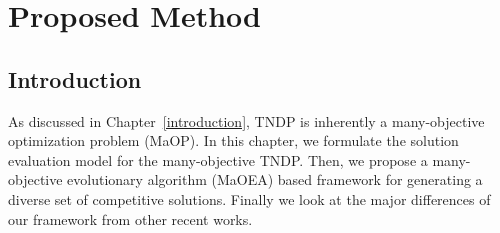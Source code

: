 \chapter{Proposed Method}
\label{proposedmethod}

\section{Introduction}

As discussed in Chapter~\ref{introduction}, TNDP is inherently a many-objective optimization problem (MaOP). In this chapter, we formulate the solution evaluation model for the many-objective TNDP. Then, we propose a many-objective evolutionary algorithm (MaOEA) based framework for generating a diverse set of competitive solutions. Finally we look at the major differences of our framework from other recent works.

